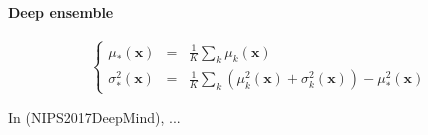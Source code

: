 \paragraph{Deep ensemble}

\begin{equation}
    \left\{
        \begin{array}{lll}
            \mu_*(\bm{x})      &=& \frac{1}{K} \sum_k \mu_k(\bm{x}) \\
            \sigma_*^2(\bm{x}) &=& \frac{1}{K} \sum_k (\mu_k^2(\bm{x}) + \sigma_k^2(\bm{x})) - \mu_*^2(\bm{x})
        \end{array}
    \right.
\end{equation}

In (NIPS2017DeepMind), ...
